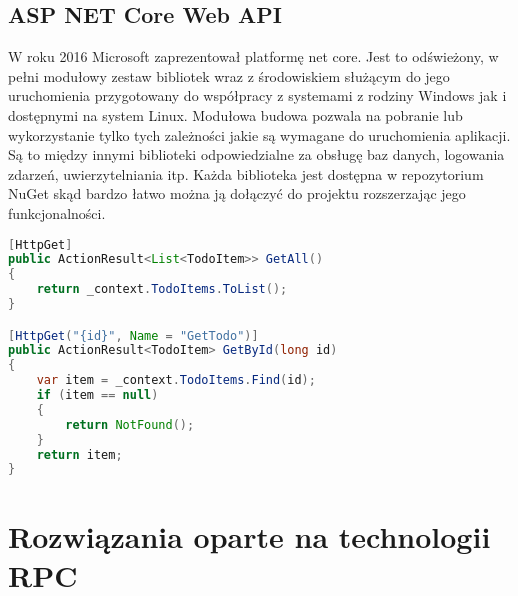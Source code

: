 \subsection{ASP NET Core Web API}
W roku 2016 Microsoft zaprezentował platformę net core. Jest to odświeżony, w pełni modułowy zestaw bibliotek wraz z środowiskiem służącym do jego uruchomienia przygotowany do współpracy z systemami z rodziny Windows jak i dostępnymi na system Linux. Modułowa budowa pozwala na pobranie lub wykorzystanie tylko tych zależności jakie są wymagane do uruchomienia aplikacji. Są to między innymi biblioteki odpowiedzialne za obsługę baz danych, logowania zdarzeń, uwierzytelniania itp. Każda biblioteka jest dostępna w repozytorium NuGet skąd bardzo łatwo można ją dołączyć do projektu rozszerzając\cite{reynders2018modern} jego funkcjonalności.
\begin{lstlisting}[language=java, caption=Przykład definicji adresów URI dla metod http w kontrolerze]
[HttpGet]
public ActionResult<List<TodoItem>> GetAll()
{
    return _context.TodoItems.ToList();
}

[HttpGet("{id}", Name = "GetTodo")] 
public ActionResult<TodoItem> GetById(long id)
{
    var item = _context.TodoItems.Find(id);
    if (item == null)
    {
        return NotFound();
    }
    return item;
}
\end{lstlisting}
\section{Rozwiązania oparte na technologii RPC}
